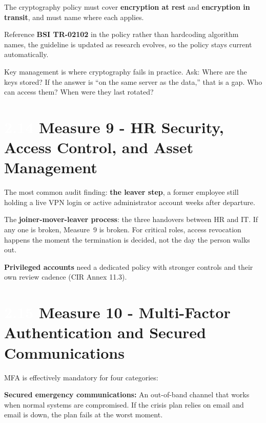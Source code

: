 \documentclass[11pt,a4paper,twoside]{book}
\newcommand{\lessontag}[1]{%
  \texorpdfstring{%
    \setlength{\fboxsep}{3pt}\colorbox{nisd2blue}{\textcolor{white}{\footnotesize\bfseries #1}}\quad%
  }{Lesson #1\ }%
}
\begin{document}
The cryptography policy must cover \textbf{encryption at rest} and \textbf{encryption in transit}, and must name where each applies.

Reference \textbf{BSI TR-02102} in the policy rather than hardcoding algorithm names, the guideline is updated as research evolves, so the policy stays current automatically.

Key management is where cryptography fails in practice. Ask: Where are the keys stored? If the answer is ``on the same server as the data,'' that is a gap. Who can access them? When were they last rotated?

\section{\lessontag{2.14}Measure 9 - HR Security, Access Control, and Asset Management}

The most common audit finding: \textbf{the leaver step}, a former employee still holding a live VPN login or active administrator account weeks after departure.

The \textbf{joiner-mover-leaver process}: the three handovers between HR and IT. If any one is broken, Measure~9 is broken. For critical roles, access revocation happens the moment the termination is decided, not the day the person walks out.

\textbf{Privileged accounts} need a dedicated policy with stronger controls and their own review cadence (CIR Annex 11.3).

\section{\lessontag{2.15}Measure 10 - Multi-Factor Authentication and Secured Communications}

MFA is effectively mandatory for four categories:

\begin{center}
\end{center}

\textbf{Secured emergency communications:} An out-of-band channel that works when normal systems are compromised. If the crisis plan relies on email and email is down, the plan fails at the worst moment.
\end{document}
